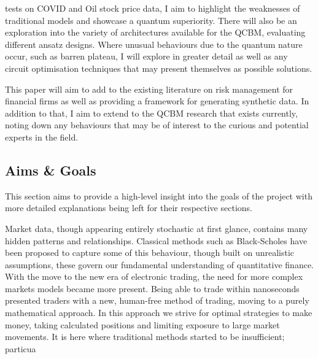 \documentclass[12pt]{article}
\newcommand{\newp}
    {
    \vskip 0.5cm 
  }
\numberwithin{equation}{section}
\begin{document}
tests on COVID and Oil stock price data, I aim to highlight the weaknesses of traditional models 
and showcase a quantum superiority.
There will also be an exploration into the variety of architectures 
available for the QCBM, evaluating different ansatz designs. Where unusual behaviours
due to the quantum nature occur, such as barren plateau, I will explore in greater detail 
as well as any circuit optimisation techniques that may present themselves as 
possible solutions. 
\newp
This paper will aim to add to the existing literature on risk management for 
financial firms as well as providing a framework for generating synthetic 
data. In addition to that, I aim to extend to the QCBM research that exists 
currently, noting down any behaviours that may be of interest to the curious 
and potential 
experts in the field. 
\clearpage
\subsection{Aims \& Goals}
This section aims to provide a high-level insight into the goals of the 
project with more detailed explanations being left for their respective sections. 
\newp 
Market data, though appearing entirely stochastic at first glance, contains many 
hidden patterns and relationships. Classical methods such as Black-Scholes  
\autocite{blackscholes} have been proposed to capture some of this behaviour, 
though built on unrealistic assumptions, these govern 
our fundamental understanding of quantitative finance. With the move to the new era 
of electronic trading, the need for more complex markets models became more present.
Being able to trade within nanoseconds presented traders with a new, human-free method 
of trading, moving to a purely mathematical approach. In this approach we strive
for optimal strategies to make money, taking calculated positions and limiting 
exposure to large market movements. It is here where traditional methods started 
to be insufficient; particua
\clearpage 
\end{document}
